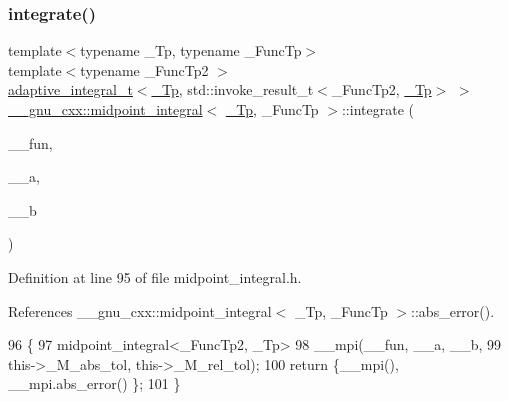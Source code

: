 \subsubsection{\texorpdfstring{integrate()}{integrate()}}
{\footnotesize\ttfamily template$<$typename \+\_\+\+Tp, typename \+\_\+\+Func\+Tp$>$ \\
template$<$typename \+\_\+\+Func\+Tp2 $>$ \\
\hyperlink{struct____gnu__cxx_1_1adaptive__integral__t}{adaptive\+\_\+integral\+\_\+t}$<$\hyperlink{namespace____gnu__cxx_a3b19a9c800ca194374ef9172290f7d79}{\+\_\+\+Tp}, std\+::invoke\+\_\+result\+\_\+t$<$\+\_\+\+Func\+Tp2, \hyperlink{namespace____gnu__cxx_a3b19a9c800ca194374ef9172290f7d79}{\+\_\+\+Tp}$>$ $>$ \hyperlink{class____gnu__cxx_1_1midpoint__integral}{\+\_\+\+\_\+gnu\+\_\+cxx\+::midpoint\+\_\+integral}$<$ \hyperlink{namespace____gnu__cxx_a3b19a9c800ca194374ef9172290f7d79}{\+\_\+\+Tp}, \+\_\+\+Func\+Tp $>$\+::integrate (\begin{DoxyParamCaption}\item[{\+\_\+\+Func\+Tp2}]{\+\_\+\+\_\+fun,  }\item[{\hyperlink{namespace____gnu__cxx_a3b19a9c800ca194374ef9172290f7d79}{\+\_\+\+Tp}}]{\+\_\+\+\_\+a,  }\item[{\hyperlink{namespace____gnu__cxx_a3b19a9c800ca194374ef9172290f7d79}{\+\_\+\+Tp}}]{\+\_\+\+\_\+b }\end{DoxyParamCaption})\hspace{0.3cm}{\ttfamily [inline]}}



Definition at line 95 of file midpoint\+\_\+integral.\+h.



References \+\_\+\+\_\+gnu\+\_\+cxx\+::midpoint\+\_\+integral$<$ \+\_\+\+Tp, \+\_\+\+Func\+Tp $>$\+::abs\+\_\+error().


\begin{DoxyCode}
96         \{
97           midpoint\_integral<\_FuncTp2, \_Tp>
98             \_\_mpi(\_\_fun, \_\_a, \_\_b,
99                   this->\_M\_abs\_tol, this->\_M\_rel\_tol);
100           \textcolor{keywordflow}{return} \{\_\_mpi(), \_\_mpi.abs\_error() \};
101         \}
\end{DoxyCode}
\mbox{\label{class____gnu__cxx_1_1midpoint__integral_aed17a2e7f3970c07e8ed08262dfe5430}} 
